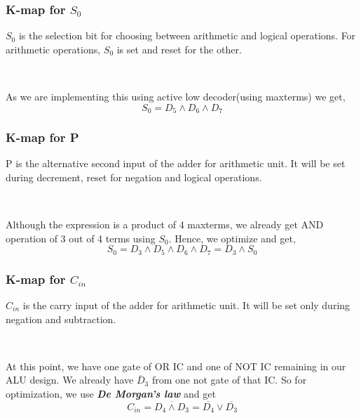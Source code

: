 \documentclass[18pt]{article}
\begin{document}
\newpage

\subsubsection{K-map for $S_{0}$}
$S_{0}$ is the selection bit for choosing between arithmetic and logical operations. For arithmetic operations, $S_{0}$ is set and reset for the other.
\begin{figure}[!h]
\end{figure}\\
\raggedright
As we are implementing this using active low decoder(using maxterms) we get, $$S_{0} = D_{5}\land D_{6} \land D_{7} $$

\subsubsection{K-map for P}
P is the alternative second input of the adder for arithmetic unit. It will be set during decrement, reset for negation and logical operations.
\begin{figure}[!h]
\end{figure}\\
\raggedright
Although the expression is a product of 4 maxterms, we already get AND operation of 3 out of 4 terms using $S_{0}$. Hence, we optimize and get, $$S_{0} = D_{3} \land D_{5}\land D_{6} \land D_{7} = D_{3} \land S_{0} $$

\subsubsection{K-map for $C_{in}$}
$C_{in}$ is the carry input of the adder for arithmetic unit. It will be set only during negation and subtraction.
\begin{figure}[!h]
\end{figure}\\
\raggedright
At this point, we have one gate of OR IC and one of NOT IC remaining in our ALU design. We already have $\overline D_{3}$  from one not gate of that IC. So for optimization, we use \textbf{\textit{De Morgan's law}} and 
get $$C_{in} = \overline{D_{4} \land D_{3}} = 
\overline{D_{4}} \lor \overline{D_{3}} $$ 
\newpage
\end{document}
